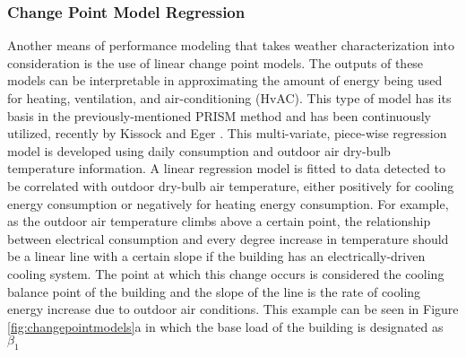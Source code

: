 \subsubsection{Change Point Model Regression}
\label{sec:changepointmodels}

Another means of performance modeling that takes weather characterization into consideration is the use of linear change point models. The outputs of these models can be interpretable in approximating the amount of energy being used for heating, ventilation, and air-conditioning (HvAC). This type of model has its basis in the previously-mentioned PRISM method and has been continuously utilized, recently by Kissock and Eger \cite{Kelly_Kissock_2008}. This multi-variate, piece-wise regression model is developed using daily consumption and outdoor air dry-bulb temperature information. A linear regression model is fitted to data detected to be correlated with outdoor dry-bulb air temperature, either positively for cooling energy consumption or negatively for heating energy consumption. For example, as the outdoor air temperature climbs above a certain point, the relationship between electrical consumption and every degree increase in temperature should be a linear line with a certain slope if the building has an electrically-driven cooling system. The point at which this change occurs is considered the cooling balance point of the building and the slope of the line is the rate of cooling energy increase due to outdoor air conditions. This example can be seen in Figure \ref{fig:changepointmodels}a in which the base load of the building is designated as $\beta_1$